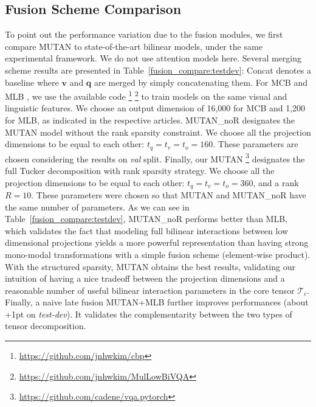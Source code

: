 \documentclass[10pt,twocolumn,letterpaper]{article}
\newcommand{\tens}[1]{
\bm{\mathcal{#1}}
}
\newcommand{\q}{\mathbf{q}}
\newcommand{\vv}{\mathbf{v}}
\begin{document}
\subsection{Fusion Scheme Comparison}
\label{sec:compafusion}

To point out the performance variation due to the fusion modules, we first compare MUTAN to state-of-the-art bilinear models, under the same experimental framework. 
We do not use attention models here. 
Several merging scheme results are presented in Table~\ref{fusion_compare:testdev}: Concat denotes a baseline where $\vv$ and $\q$ are merged by simply concatenating them. For MCB \cite{fukui16mcb} and MLB \cite{Kim2017}, we use the available code \footnote{\url{https://github.com/jnhwkim/cbp}} \footnote{\url{https://github.com/jnhwkim/MulLowBiVQA}} to train models on the same visual and linguistic features. We choose an output dimension of 16,000 for MCB and 1,200 for MLB, as indicated in the respective articles. MUTAN\_noR designates the MUTAN model without the rank sparsity constraint. We choose all the projection dimensions to be equal to each other: $t_q = t_v = t_o = 160$. These parameters are chosen considering the results on \textit{val} split. Finally, our MUTAN \footnote{\url{https://github.com/cadene/vqa.pytorch}} designates the full Tucker decomposition with rank sparsity strategy. We choose all the projection dimensions to be equal to each other: $t_q = t_v = t_o = 360$, and a rank $R = 10$. These parameters were chosen so that MUTAN and MUTAN\_noR have the same number of parameters.
 As we can see in Table~\ref{fusion_compare:testdev}, MUTAN\_noR performs better than MLB, which validates the fact that modeling full bilinear interactions between low dimensional projections yields a more powerful representation than having strong mono-modal transformations with a simple fusion scheme (element-wise product). With the structured sparsity, MUTAN obtains the best results, validating our intuition of having a nice tradeoff between the projection dimensions and a reasonable number of useful bilinear interaction parameters in the core tensor $\tens{T}_c$.
Finally, a naive late fusion MUTAN+MLB further improves performances (about +1pt on {\em test-dev}). It validates the complementarity between the two types of tensor decomposition. 
\end{document}
